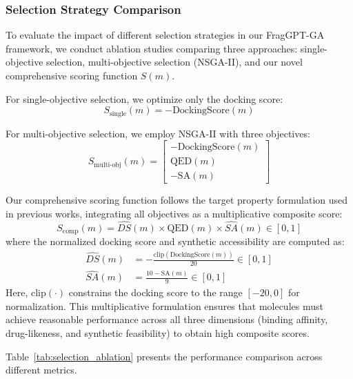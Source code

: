 \documentclass[lettersize,journal]{IEEEtran}
\begin{document}
\subsubsection{Selection Strategy Comparison}
To evaluate the impact of different selection strategies in our FragGPT-GA framework, we conduct ablation studies comparing three approaches: single-objective selection, multi-objective selection (NSGA-II), and our novel comprehensive scoring function $S(m)$. 

For single-objective selection, we optimize only the docking score:
\begin{equation}
S_{\text{single}}(m) = -\text{DockingScore}(m)
\end{equation}

For multi-objective selection, we employ NSGA-II with three objectives:
\begin{equation}
    S_{\text{multi-obj}}(m) = \begin{bmatrix} -\text{DockingScore}(m) \\ \text{QED}(m) \\ -\text{SA}(m) \end{bmatrix}
\end{equation}

Our comprehensive scoring function follows the target property formulation used in previous works, integrating all objectives as a multiplicative composite score:
\begin{equation}
S_{\text{comp}}(m) =  \widehat{DS}(m) \times \text{QED}(m) \times \widehat{SA}(m) \in [0,1]
\end{equation}
where the normalized docking score and synthetic accessibility are computed as:
\begin{align}
\widehat{DS}(m) &= -\frac{\text{clip}(\text{DockingScore}(m))}{20} \in [0,1] \\
\widehat{SA}(m) &= \frac{10 - \text{SA}(m)}{9} \in [0,1]
\end{align}
Here, $\text{clip}(\cdot)$ constrains the docking score to the range $[-20, 0]$ for normalization. This multiplicative formulation ensures that molecules must achieve reasonable performance across all three dimensions (binding affinity, drug-likeness, and synthetic feasibility) to obtain high composite scores.

Table~\ref{tab:selection_ablation} presents the performance comparison across different metrics.
\end{document}
